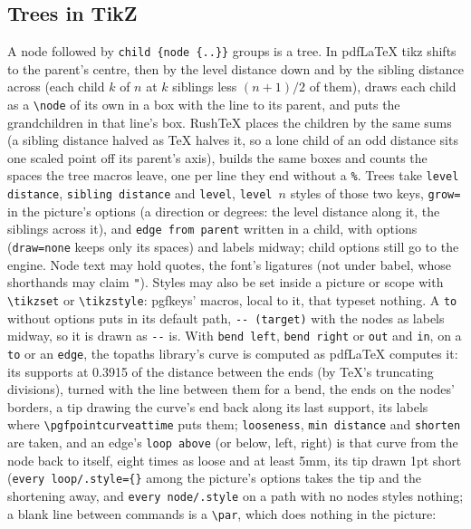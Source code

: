 \documentclass{article}
\numberwithin{equation}{section}
\theoremstyle{definition}
\theoremstyle{remark}
\begin{document}
\subsection{Trees in TikZ}\label{sec:tikztrees}
A node followed by \verb|child {node {..}}| groups is a tree. In
pdf\LaTeX{} tikz shifts to the parent's centre, then by the level distance down and by
the sibling distance across (each child $k$ of $n$ at $k$ siblings less $(n+1)/2$ of them),
draws each child as a \verb|\node| of its own in a box with the line to its parent, and
puts the grandchildren in that line's box. RushTeX places the children by the same sums
(a sibling distance halved as \TeX{} halves it, so a lone child of an odd distance sits one
scaled point off its parent's axis), builds the same boxes and counts the spaces the tree
macros leave, one per line they end without a \verb|%|. Trees take \verb|level distance|,
\verb|sibling distance| and \verb|level|, \verb|level |$n$ styles of those two keys,
\verb|grow=| in the picture's options (a direction or degrees: the level distance along it,
the siblings across it), and \verb|edge from parent| written in a child, with options
(\verb|draw=none| keeps only its spaces) and labels midway; child options still go to
the engine. Node text may hold quotes, the font's ligatures (not under babel, whose
shorthands may claim \verb|"|).
Styles may also be set inside a picture or scope with \verb|\tikzset| or
\verb|\tikzstyle|: pgfkeys' macros, local to it, that typeset nothing. A \verb|to| without
options puts in its default path, \verb|-- (target)| with the nodes as labels midway, so it
is drawn as \verb|--| is. With \verb|bend left|, \verb|bend right| or \verb|out| and
\verb|in|, on a \verb|to| or an \verb|edge|, the topaths library's curve is computed as
pdf\LaTeX{} computes it: its supports at 0.3915 of the distance between the ends (by
\TeX's truncating divisions), turned with the line between them for a bend, the ends on
the nodes' borders, a tip drawing the curve's end back along its last support, its
labels where \verb|\pgfpointcurveattime| puts them; \verb|looseness|,
\verb|min distance| and \verb|shorten| are taken, and an edge's \verb|loop above| (or below, left,
right) is that curve from the node back to itself, eight times as loose and at least 5mm,
its tip drawn 1pt short (\verb|every loop/.style={}| among the picture's options takes the
tip and the shortening away, and \verb|every node/.style| on a path with no nodes styles
nothing; a blank line between commands is a \verb|\par|, which does nothing in the picture:
\end{document}

